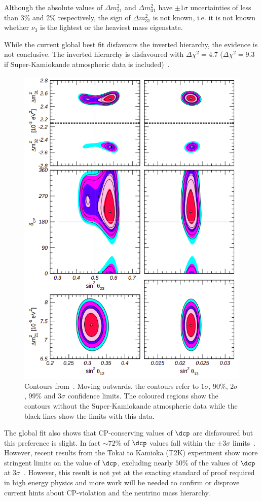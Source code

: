 Although the absolute values of $\Delta m^{2}_{21}$ and $\Delta m^{2}_{31}$ have $\pm1\sigma$ uncertainties of less than 3\% and 2\% respectively, the sign of $\Delta m^{2}_{31}$ is not known, i.e. it is not known whether $\nu_{3}$ is the lightest or the heaviest mass eigenstate.

While the current global best fit disfavours the inverted hierarchy, the evidence is not conclusive.
The inverted hierarchy is disfavoured with $\Delta \chi^{2}=4.7$ ($\Delta \chi^{2}=9.3$ if Super-Kamiokande atmospheric data is included)~\cite{nufit4}.

\begin{figure}[h]
  \centering
  \includegraphics[width=.75\linewidth]{files/figures/theory/nufit4Contours}
  \caption[Global 2-dimensional limits on oscillation parameters.]{Contours from~\cite{nufit4}. Moving outwards, the contours refer to $1\sigma$, 90\%, $2\sigma$, 99\% and $3\sigma$ confidence limits. The coloured regions show the contours without the Super-Kamiokande atmospheric data while the black lines show the limits with this data.}
  \label{fig:nufit4Contours}
\end{figure}

The global fit also shows that CP-conserving values of $\dcp$ are disfavoured but this preference is slight.
In fact $\sim72\%$ of $\dcp$ values fall within the $\pm3\sigma$ limits~\cite{nufit4}.
However, recent results from the Tokai to Kamioka (T2K) experiment show more stringent limits on the value of $\dcp$, excluding nearly $50\%$ of the values of $\dcp$ at $3\sigma$~\cite{t2kRecent}.
However, this result is not yet at the exacting standard of proof required in high energy physics and more work will be needed to confirm or disprove current hints about CP-violation and the neutrino mass hierarchy.

